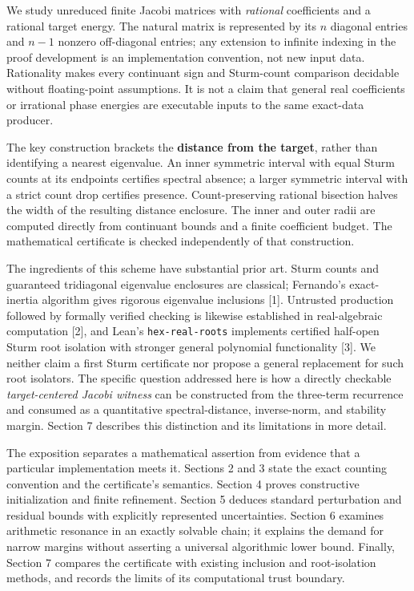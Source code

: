 \documentclass[
  11pt,
]{article}
\begin{document}
We study unreduced finite Jacobi matrices with \emph{rational}
coefficients and a rational target energy. The natural matrix is
represented by its \(n\) diagonal entries and \(n-1\) nonzero
off-diagonal entries; any extension to infinite indexing in the proof
development is an implementation convention, not new input data.
Rationality makes every continuant sign and Sturm-count comparison
decidable without floating-point assumptions. It is not a claim that
general real coefficients or irrational phase energies are executable
inputs to the same exact-data producer.

The key construction brackets the \textbf{distance from the target},
rather than identifying a nearest eigenvalue. An inner symmetric
interval with equal Sturm counts at its endpoints certifies spectral
absence; a larger symmetric interval with a strict count drop certifies
presence. Count-preserving rational bisection halves the width of the
resulting distance enclosure. The inner and outer radii are computed
directly from continuant bounds and a finite coefficient budget. The
mathematical certificate is checked independently of that construction.

The ingredients of this scheme have substantial prior art. Sturm counts
and guaranteed tridiagonal eigenvalue enclosures are classical;
Fernando's exact-inertia algorithm gives rigorous eigenvalue inclusions
{[}1{]}. Untrusted production followed by formally verified checking is
likewise established in real-algebraic computation {[}2{]}, and Lean's
\texttt{hex-real-roots} implements certified half-open Sturm root
isolation with stronger general polynomial functionality {[}3{]}. We
neither claim a first Sturm certificate nor propose a general
replacement for such root isolators. The specific question addressed
here is how a directly checkable \emph{target-centered Jacobi witness}
can be constructed from the three-term recurrence and consumed as a
quantitative spectral-distance, inverse-norm, and stability margin.
Section 7 describes this distinction and its limitations in more detail.

The exposition separates a mathematical assertion from evidence that a
particular implementation meets it. Sections 2 and 3 state the exact
counting convention and the certificate's semantics. Section 4 proves
constructive initialization and finite refinement. Section 5 deduces
standard perturbation and residual bounds with explicitly represented
uncertainties. Section 6 examines arithmetic resonance in an exactly
solvable chain; it explains the demand for narrow margins without
asserting a universal algorithmic lower bound. Finally, Section 7
compares the certificate with existing inclusion and root-isolation
methods, and records the limits of its computational trust boundary.
\end{document}
